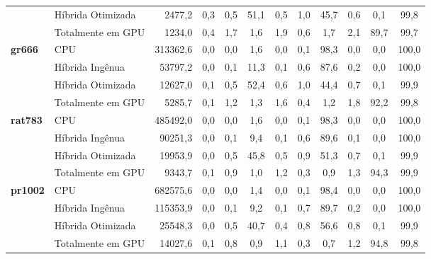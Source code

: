 \begin{tabeladensa}
\begin{longtable}[]{@{}llrccccccccc@{}}
                     & Híbrida Otimizada & 2477,2   & 0,3 & 0,5 & 51,1 & 0,5  & 1,0 & 45,7 & 0,6  & 0,1  & 99,8  \\*
                     & Totalmente em GPU & 1234,0   & 0,4 & 1,7 & 1,6  & 1,9  & 0,6 & 1,7  & 2,1  & 89,7 & 99,7  \\
  \midrule
  \textbf{gr666}     & CPU               & 313362,6 & 0,0 & 0,0 & 1,6  & 0,0  & 0,1 & 98,3 & 0,0  & 0,0  & 100,0 \\*
                     & Híbrida Ingênua   & 53797,2  & 0,0 & 0,1 & 11,3 & 0,1  & 0,6 & 87,6 & 0,2  & 0,0  & 100,0 \\*
                     & Híbrida Otimizada & 12627,0  & 0,1 & 0,5 & 52,4 & 0,6  & 1,0 & 44,4 & 0,7  & 0,1  & 99,9  \\*
                     & Totalmente em GPU & 5285,7   & 0,1 & 1,2 & 1,3  & 1,6  & 0,4 & 1,2  & 1,8  & 92,2 & 99,8  \\
  \midrule
  \textbf{rat783}    & CPU               & 485492,0 & 0,0 & 0,0 & 1,6  & 0,0  & 0,1 & 98,3 & 0,0  & 0,0  & 100,0 \\*
                     & Híbrida Ingênua   & 90251,3  & 0,0 & 0,1 & 9,4  & 0,1  & 0,6 & 89,6 & 0,1  & 0,0  & 100,0 \\*
                     & Híbrida Otimizada & 19953,9  & 0,0 & 0,5 & 45,8 & 0,5  & 0,9 & 51,3 & 0,7  & 0,1  & 99,9  \\*
                     & Totalmente em GPU & 9343,7   & 0,1 & 0,9 & 1,0  & 1,2  & 0,3 & 0,9  & 1,3  & 94,3 & 99,9  \\
  \midrule
  \textbf{pr1002}    & CPU               & 682575,6 & 0,0 & 0,0 & 1,4  & 0,0  & 0,1 & 98,4 & 0,0  & 0,0  & 100,0 \\*
                     & Híbrida Ingênua   & 115353,9 & 0,0 & 0,1 & 9,2  & 0,1  & 0,7 & 89,7 & 0,2  & 0,0  & 100,0 \\*
                     & Híbrida Otimizada & 25548,3  & 0,0 & 0,5 & 40,7 & 0,4  & 0,8 & 56,6 & 0,8  & 0,1  & 99,9  \\*
                     & Totalmente em GPU & 14027,6  & 0,1 & 0,8 & 0,9  & 1,1  & 0,3 & 0,7  & 1,2  & 94,8 & 99,8  \\
\end{longtable}
\end{tabeladensa}
